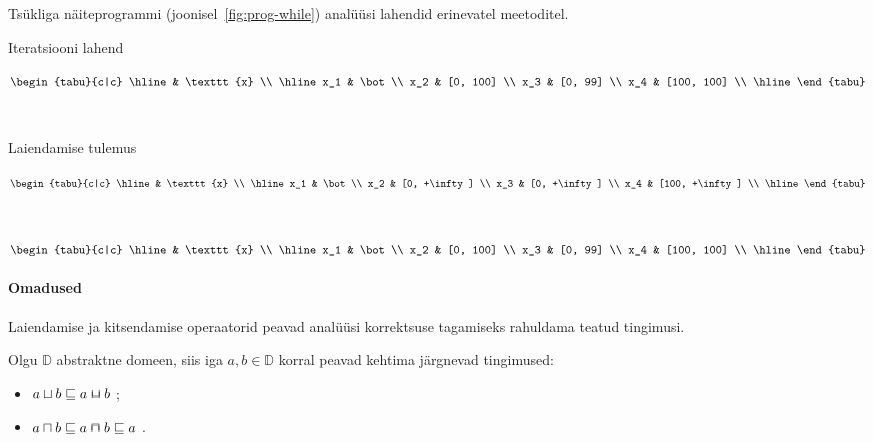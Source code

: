 \documentclass[../thesis.tex]{subfiles}
\begin{document}
\begin{table}
	\caption{Tsükliga näiteprogrammi (joonisel~\ref{fig:prog-while}) analüüsi lahendid erinevatel meetoditel.}
	\centering
	\begin{subtable}[t]{0.3\textwidth}
		\caption{Iteratsiooni lahend}
		\centering
		$\begin{tabu}{c|c}
		\hline
		 & \texttt{x} \\
		\hline
		x_1 & \bot \\
		x_2 & [0, 100] \\
		x_3 & [0, 99] \\
		x_4 & [100, 100] \\
		\hline
		\end{tabu}$
		\label{tab:while-iter}
	\end{subtable}
	~
	\begin{subtable}[t]{0.3\textwidth}
		\caption{Laiendamise tulemus}
		\centering
		$\begin{tabu}{c|c}
		\hline
		 & \texttt{x} \\
		\hline
		x_1 & \bot \\
		x_2 & [0, +\infty] \\
		x_3 & [0, +\infty] \\
		x_4 & [100, +\infty] \\
		\hline
		\end{tabu}$
		\label{tab:while-widen}
	\end{subtable}
	~
	\begin{subtable}[t]{0.3\textwidth}
		\caption{Kitsendamise tulemus}
		\centering
		$\begin{tabu}{c|c}
		\hline
		 & \texttt{x} \\
		\hline
		x_1 & \bot \\
		x_2 & [0, 100] \\
		x_3 & [0, 99] \\
		x_4 & [100, 100] \\
		\hline
		\end{tabu}$
		\label{tab:while-narrow}
	\end{subtable}
	\label{tab:itersolve-while}
\end{table}

\paragraph{Omadused}
Laiendamise ja kitsendamise operaatorid peavad analüüsi korrektsuse tagamiseks rahuldama teatud tingimusi.

\noindent
Olgu $\mathbb{D}$ abstraktne domeen, siis iga $a, b \in \mathbb{D}$ korral peavad kehtima järgnevad tingimused:
\begin{itemize}[nosep]
	\item $a \sqcup b \sqleq a \widen b$ \cite[61]{seidl_foundations};
	\item $a \sqcap b \sqleq a \narrow b \sqleq a$ \cite[66]{seidl_foundations}.
\end{itemize}
\end{document}
